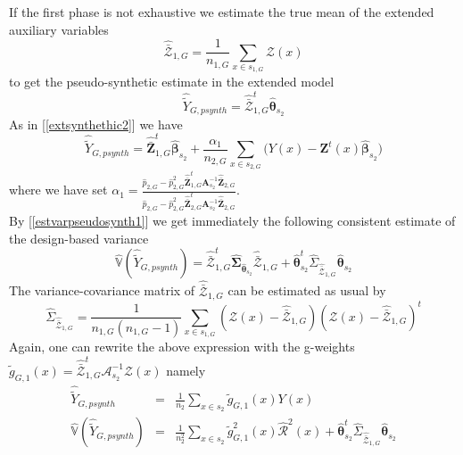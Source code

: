 \documentclass[a4paper,12pt,leqno, titlepage]{article}
\newcommand{\VAR}{\mathbb{V}}
\begin{document}
If the first phase is not exhaustive we estimate the true mean of the extended auxiliary variables
\begin{equation}
\hat{\bar{\pmb{\mathcal{Z}}}}_{1,G}=\frac{1}{n_{1,G}}\sum_{x\in{s_{1,G}}}
\pmb{\mathcal{Z}}(x)
\end{equation}
to get the pseudo-synthetic estimate in the extended model
\begin{equation}\label{pseudosyntheticextended1}
\hat{\tilde{Y}}_{G,psynth}=\hat{\bar{\pmb{\mathcal{Z}}}}_{1,G}^t\hat{\pmb{\theta}}_{s_2}
\end{equation}
As in [\ref{extsynthethic2}] we have
\begin{equation}\label{extsynthethic3}
\hat{\tilde{Y}}_{G,psynth}=\hat{\bar{\pmb{Z}}}_{1,G}^t\hat{\pmb{\beta}}_{s_2}+
\frac{\alpha_1}{n_{2,G}}\sum_{x\in{s_{2,G}}}\big(Y(x)-\pmb{Z}^t(x)\hat{\pmb{\beta}}_{s_2}\big)
\end{equation}
where we have set
$\alpha_1=\frac{\hat{p}_{2,G}-\hat{p}^2_{2,G}\hat{\bar{\pmb{Z}}}_{1,G}^t
\pmb{A}^{-1}_{s_2}\hat{\bar{\pmb{Z}}}_{2,G}}
{\hat{p}_{2,G}-\hat{p}^2_{2,G}\hat{\bar{\pmb{Z}}}_{2,G}^t
\pmb{A}^{-1}_{s_2}\hat{\bar{\pmb{Z}}}_{2,G}}$.\\
By [\ref{estvarpseudosynth1}] we get immediately the following consistent estimate of the design-based variance
\begin{equation}\label{estvarpsynth1extended}
\hat{\VAR}(\hat{\tilde{Y}}_{G,psynth})=
\hat{\bar{\pmb{\mathcal{Z}}}}_{1,G}^t\hat{\pmb{\Sigma}}_{\hat{\pmb{\theta}}_{s_2}}
\hat{\bar{\pmb{\mathcal{Z}}}}_{1,G}
+ \hat{\pmb{\theta}}^t_{s_2}\hat{\Sigma}_{\hat{\bar{\pmb{\mathcal{Z}}}}_{1,G}}\hat{\pmb{\theta}}_{s_2}
\end{equation}
The variance-covariance matrix of $\hat{\bar{\pmb{\mathcal{Z}}}}_{1,G}$ can be estimated as usual by
\begin{equation}\label{estvarcovaux}
\hat{\Sigma}_{\hat{\bar{\pmb{\mathcal{Z}}}}_{1,G}}=
\frac{1}{n_{1,G} (n_{1,G}-1)}\sum_{x\in{s_{1,G}}}
(\pmb{\mathcal{Z}}(x)-\hat{\bar{\pmb{\mathcal{Z}}}}_{1,G})(\pmb{\mathcal{Z}}(x)-
\hat{\bar{\pmb{\mathcal{Z}}}}_{1,G})^t
\end{equation}
Again, one can rewrite the above expression with the g-weights
$\tilde{g}_{G,1}(x)=\hat{\bar{\pmb{\mathcal{Z}}}}_{1,G}^t
\pmb{\mathcal{A}}^{-1}_{s_2}\pmb{\mathcal{Z}}(x)$
namely
\begin{eqnarray}\label{gweightextended}
\hat{\tilde{Y}}_{G,psynth}&=&\frac{1}{n_2}\sum_{x\in{s_2}}\tilde{g}_{G,1}(x)Y(x)\\
\hat{\VAR}(\hat{\tilde{Y}}_{G,psynth})&=&\frac{1}{n^2_2}
\sum_{x\in{s_2}}\tilde{g}^2_{G,1}(x)\hat{\mathcal{R}}^2(x)+
\hat{\pmb{\theta}}^t_{s_2}\hat{\Sigma}_{\hat{\bar{\pmb{\mathcal{Z}}}}_{1,G}}\hat{\pmb{\theta}}_{s_2}
\end{eqnarray}
\end{document}
